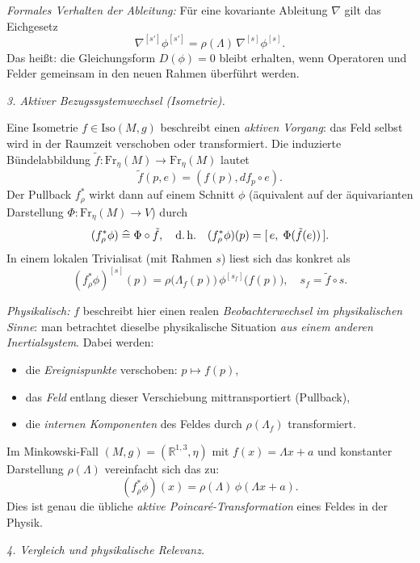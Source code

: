 \documentclass[10pt, letterpaper]{article}
\newcommand{\R}{\mathbb{R}}
\newcommand{\Iso}{\mathrm{Iso}}
\begin{document}
\smallskip
\emph{Formales Verhalten der Ableitung:}
Für eine kovariante Ableitung $\nabla$ gilt das Eichgesetz
\[
\nabla^{[s']}\phi^{[s']}=\rho(\Lambda)\,\nabla^{[s]}\phi^{[s]}.
\]
Das heißt: die Gleichungsform $D(\phi)=0$ bleibt erhalten, wenn Operatoren und Felder
gemeinsam in den neuen Rahmen überführt werden.

\bigskip
\emph{3. Aktiver Bezugssystemwechsel (Isometrie).}

Eine Isometrie $f\in\Iso(M,g)$ beschreibt einen \emph{aktiven Vorgang}:
das Feld selbst wird in der Raumzeit verschoben oder transformiert.
Die induzierte Bündelabbildung $\tilde f:\mathrm{Fr}_\eta(M)\to \mathrm{Fr}_\eta(M)$ lautet
\[
\tilde f(p,e)=(f(p),df_p\circ e).
\]
Der Pullback $f^*_\rho$ wirkt dann auf einem Schnitt $\phi$ (äquivalent auf der äquivarianten Darstellung
$\Phi:\mathrm{Fr}_\eta(M)\to V$) durch
\[
(f^*_\rho\phi)\;\widehat{=}\;\Phi\circ\tilde f,
\quad\text{d.\,h.}\quad
(f^*_\rho\phi)(p)=[\,e,\;\Phi(\tilde f(e))\,].
\]
In einem lokalen Trivialisat (mit Rahmen $s$) liest sich das konkret als
\[
\boxed{\quad
(f^*_\rho\phi)^{[s]}(p)
=\rho\!\big(\Lambda_f(p)\big)\,\phi^{[s_f]}\!\big(f(p)\big),
\quad s_f=\tilde f\circ s.
\quad}
\]

\smallskip
\emph{Physikalisch:}
$f$ beschreibt hier einen realen \emph{Beobachterwechsel im physikalischen Sinne}:
man betrachtet dieselbe physikalische Situation \emph{aus einem anderen Inertialsystem}.
Dabei werden:
\begin{itemize}
  \item die \emph{Ereignispunkte} verschoben: $p\mapsto f(p)$,
  \item das \emph{Feld} entlang dieser Verschiebung mittransportiert (Pullback),
  \item die \emph{internen Komponenten} des Feldes durch $\rho(\Lambda_f)$ transformiert.
\end{itemize}

\smallskip
Im Minkowski-Fall $(M,g)=(\R^{1,3},\eta)$ mit $f(x)=\Lambda x + a$
und konstanter Darstellung $\rho(\Lambda)$ vereinfacht sich das zu:
\[
\boxed{\quad
(f^*_\rho\phi)(x)=\rho(\Lambda)\,\phi(\Lambda x + a).
\quad}
\]
Dies ist genau die übliche \emph{aktive Poincaré-Transformation}
eines Feldes in der Physik.

\bigskip
\emph{4. Vergleich und physikalische Relevanz.}
\end{document}
